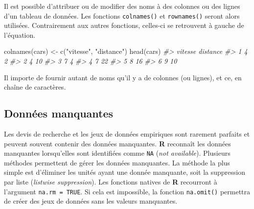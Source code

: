 \documentclass[
]{book}
\newenvironment{Shaded}{}{}
\newcommand{\CommentTok}[1]{\textit{#1}}
\newcommand{\FunctionTok}[1]{#1}
\newcommand{\NormalTok}[1]{#1}
\newcommand{\OtherTok}[1]{#1}
\newcommand{\StringTok}[1]{#1}
\begin{document}
Il est possible d'attribuer ou de modifier des noms à des colonnes ou des lignes d'un tableau de données. Les fonctions \texttt{colnames()} et \texttt{rownames()} seront alors utilisées. Contrairement aux autres fonctions, celles-ci se retrouvent à gauche de l'équation.

\begin{Shaded}
\begin{Highlighting}[]
\FunctionTok{colnames}\NormalTok{(cars) }\OtherTok{\textless{}{-}}  \FunctionTok{c}\NormalTok{(}\StringTok{"vitesse"}\NormalTok{, }\StringTok{"distance"}\NormalTok{)}
\FunctionTok{head}\NormalTok{(cars)}
\CommentTok{\#\textgreater{}   vitesse distance}
\CommentTok{\#\textgreater{} 1       4        2}
\CommentTok{\#\textgreater{} 2       4       10}
\CommentTok{\#\textgreater{} 3       7        4}
\CommentTok{\#\textgreater{} 4       7       22}
\CommentTok{\#\textgreater{} 5       8       16}
\CommentTok{\#\textgreater{} 6       9       10}
\end{Highlighting}
\end{Shaded}

Il importe de fournir autant de noms qu'il y a de colonnes (ou lignes), et ce, en chaîne de caractères.

\hypertarget{donnuxe9es-manquantes}{%
\subsection{Données manquantes}\label{donnuxe9es-manquantes}}

Les devis de recherche et les jeux de données empiriques sont rarement parfaits et peuvent souvent contenir des données manquantes. \textbf{R} reconnaît les données manquantes lorsqu'elles sont identifiées comme \texttt{NA} (\emph{not available}). Plusieurs méthodes permettent de gérer les données manquantes. La méthode la plus simple est d'éliminer les unités ayant une donnée manquante, soit la suppression par liste (\emph{listwise suppression}). Les fonctions natives de \textbf{R} recourront à l'argument \texttt{na.rm\ =\ TRUE}. Si cela est impossible, la fonction \texttt{na.omit()} permettra de créer des jeux de données sans les valeurs manquantes.
\end{document}
